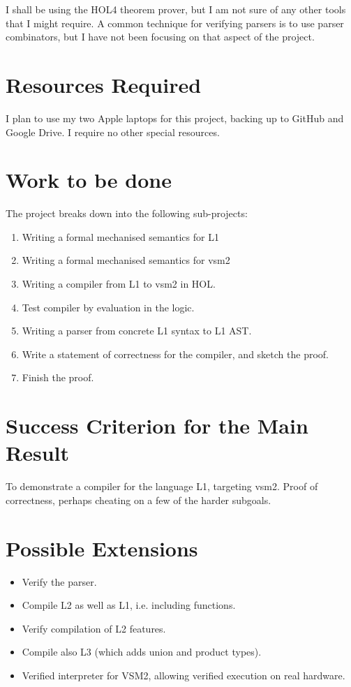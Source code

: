 \documentclass[12pt,a4paper,twoside]{article}
\begin{document}
I shall be using the HOL4 theorem prover, but I am not sure of any other tools
that I might require. A common technique for verifying parsers is to use parser
combinators, but I have not been focusing on that aspect of the project.

\section*{Resources Required}

I plan to use my two Apple laptops for this project, backing up to GitHub and Google Drive. I require no other special resources.

\section*{Work to be done}

The project breaks down into the following sub-projects:

\begin{enumerate}
\item
Writing a formal mechanised semantics for L1

\item
Writing a formal mechanised semantics for vsm2

\item
Writing a compiler from L1 to vsm2 in HOL.

\item
Test compiler by evaluation in the logic.

\item
Writing a parser from concrete L1 syntax to L1 AST.

\item
Write a statement of correctness for the compiler, and sketch the proof.

\item
Finish the proof.

\end{enumerate}

\section*{Success Criterion for the Main Result}

To demonstrate a compiler for the language L1, targeting vsm2. Proof of correctness, perhaps cheating
on a few of the harder subgoals.

\section*{Possible Extensions}
\begin{itemize}
\item
Verify the parser.
\item
Compile L2 as well as L1, i.e. including functions.
\item
Verify compilation of L2 features.
\item
Compile also L3 (which adds union and product types).
\item
Verified interpreter for VSM2, allowing verified execution on real hardware.
\end{itemize}
\end{document}
